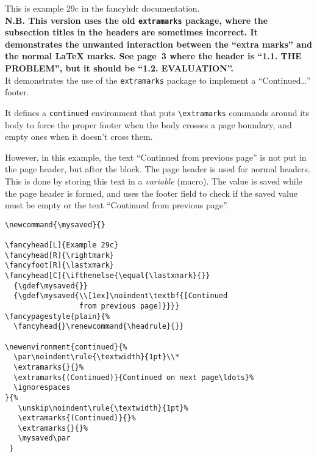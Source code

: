 \documentclass{report}
\newcommand{\mysaved}{}
\begin{document}
\tableofcontents

\thispagestyle{plain}
\noindent
\begin{boxedminipage}{\textwidth}
This is example 29c in the fancyhdr documentation.
\\[1ex]
\textbf{N.B. This version uses the old \texttt{extramarks} package, where the subsection titles in the headers are sometimes incorrect. It demonstrates the unwanted interaction between the ``extra marks'' and the normal \LaTeX{} marks. See page~3 where the header is ``1.1. THE PROBLEM'', but it should be ``1.2. EVALUATION''.}
\\[1ex]
It demonstrates the use of the \texttt{extramarks} package to implement
a ``Continued\ldots'' footer.

It defines a \texttt{continued} environment that puts \verb|\extramarks| commands around its body to force the proper footer when the body crosses a page boundary, and empty ones when it doesn't cross them.

However, in this example, the text ``Continued from previous page'' is not put in the page header, but after the block. The page header is used for normal headers. This is done by storing this text in a \emph{variable} (macro). The value is saved while the page header is formed, and uses the footer field to check if the saved value must be empty or the text ``Continued from previous page''.

\begin{verbatim}
\newcommand{\mysaved}{}

\fancyhead[L]{Example 29c}
\fancyhead[R]{\rightmark}
\fancyfoot[R]{\lastxmark}
\fancyhead[C]{\ifthenelse{\equal{\lastxmark}{}}
  {\gdef\mysaved{}}
  {\gdef\mysaved{\\[1ex]\noindent\textbf{[Continued
                 from previous page]}}}}
\fancypagestyle{plain}{%
  \fancyhead{}\renewcommand{\headrule}{}}

\newenvironment{continued}{%
  \par\noindent\rule{\textwidth}{1pt}\\*
  \extramarks{}{}%
  \extramarks{(Continued)}{Continued on next page\ldots}%
  \ignorespaces
}{%
   \unskip\noindent\rule{\textwidth}{1pt}%
   \extramarks{(Continued)}{}%
   \extramarks{}{}%
   \mysaved\par
 }
\end{verbatim}

\end{boxedminipage}

\pagestyle{fancy}
\end{document}
